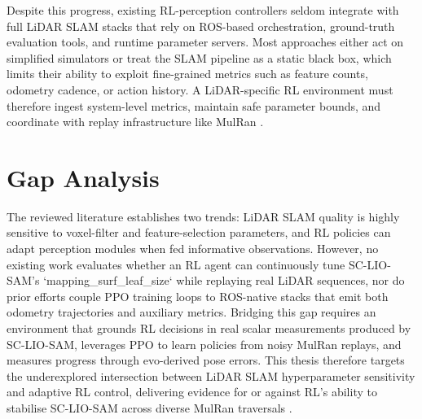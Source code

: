 Despite this progress, existing RL-perception controllers seldom integrate with full LiDAR SLAM stacks that rely on ROS-based orchestration, ground-truth evaluation tools, and runtime parameter servers. Most approaches either act on simplified simulators or treat the SLAM pipeline as a static black box, which limits their ability to exploit fine-grained metrics such as feature counts, odometry cadence, or action history. A LiDAR-specific RL environment must therefore ingest system-level metrics, maintain safe parameter bounds, and coordinate with replay infrastructure like MulRan \cite{kim_2020_mulran}.

\section{Gap Analysis}
The reviewed literature establishes two trends: LiDAR SLAM quality is highly sensitive to voxel-filter and feature-selection parameters, and RL policies can adapt perception modules when fed informative observations. However, no existing work evaluates whether an RL agent can continuously tune SC-LIO-SAM’s `mapping\_surf\_leaf\_size` while replaying real LiDAR sequences, nor do prior efforts couple PPO training loops to ROS-native stacks that emit both odometry trajectories and auxiliary metrics. Bridging this gap requires an environment that grounds RL decisions in real scalar measurements produced by SC-LIO-SAM, leverages PPO to learn policies from noisy MulRan replays, and measures progress through evo-derived pose errors. This thesis therefore targets the underexplored intersection between LiDAR SLAM hyperparameter sensitivity and adaptive RL control, delivering evidence for or against RL’s ability to stabilise SC-LIO-SAM across diverse MulRan traversals \cite{shan_2020_liosam,kim_2020_mulran,nicomessikommer_2024_reinforcement}.
